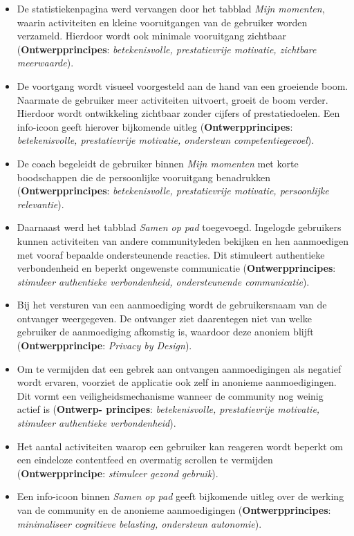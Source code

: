{\small
    \begin{itemize}
        \item De statistiekenpagina werd vervangen door het tabblad \textit{Mijn momenten}, waarin activiteiten en kleine vooruitgangen van de gebruiker worden verzameld. Hierdoor wordt ook minimale vooruitgang zichtbaar (\textbf{Ontwerpprincipes}: \textit{betekenisvolle, prestatievrije motivatie, zichtbare meerwaarde}).
        
        \item De voortgang wordt visueel voorgesteld aan de hand van een groeiende boom. Naarmate de gebruiker meer activiteiten uitvoert, groeit de boom verder. Hierdoor wordt ontwikkeling zichtbaar zonder cijfers of prestatiedoelen. Een info-icoon geeft hierover bijkomende uitleg (\textbf{Ontwerpprincipes}: \textit{betekenisvolle, prestatievrije motivatie, ondersteun competentiegevoel}).
        
        \item De coach begeleidt de gebruiker binnen \textit{Mijn momenten} met korte boodschappen die de persoonlijke vooruitgang benadrukken (\textbf{Ontwerpprincipes}: \textit{betekenisvolle, prestatievrije motivatie, persoonlijke relevantie}).
        
        \item Daarnaast werd het tabblad \textit{Samen op pad} toegevoegd. Ingelogde gebruikers kunnen activiteiten van andere communityleden bekijken en hen aanmoedigen met vooraf bepaalde ondersteunende reacties. Dit stimuleert authentieke verbondenheid en beperkt ongewenste communicatie (\textbf{Ontwerpprincipes}: \textit{stimuleer authentieke verbondenheid, ondersteunende communicatie}).
        
        \item Bij het versturen van een aanmoediging wordt de gebruikersnaam van de ontvanger weergegeven. De ontvanger ziet daarentegen niet van welke gebruiker de aanmoediging afkomstig is, waardoor deze anoniem blijft (\textbf{Ontwerpprincipe}: \textit{Privacy by Design}).
        
        \item Om te vermijden dat een gebrek aan ontvangen aanmoedigingen als negatief wordt ervaren, voorziet de applicatie ook zelf in anonieme aanmoedigingen. Dit vormt een veiligheidsmechanisme wanneer de community nog weinig actief is (\textbf{Ontwerp- principes}: \textit{betekenisvolle, prestatievrije motivatie, stimuleer authentieke verbondenheid}).
        
        \item Het aantal activiteiten waarop een gebruiker kan reageren wordt beperkt om een eindeloze contentfeed en overmatig scrollen te vermijden (\textbf{Ontwerpprincipe}: \textit{stimuleer gezond gebruik}).
        
        \item Een info-icoon binnen \textit{Samen op pad} geeft bijkomende uitleg over de werking van de community en de anonieme aanmoedigingen (\textbf{Ontwerpprincipes}: \textit{minimaliseer cognitieve belasting, ondersteun autonomie}).
    \end{itemize}
}

